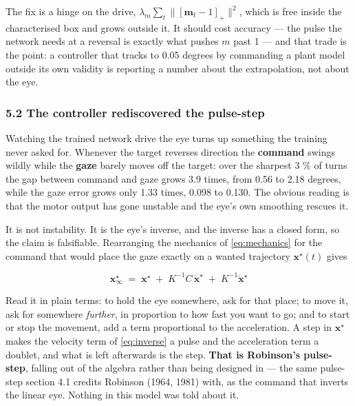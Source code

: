 \documentclass[10pt]{article}
\begin{document}
The fix is a hinge on the drive, $\lambda_m \sum_t \|[\mathbf{m}_t-1]_+\|^2$, which is free
inside the characterised box and grows outside it. It should cost accuracy --- the pulse the
network needs at a reversal is exactly what pushes $m$ past 1 --- and that trade is the
point: a controller that tracks to 0.05 degrees by commanding a plant model outside its own
validity is reporting a number about the extrapolation, not about the eye.

\subsubsection*{5.2 The controller rediscovered the pulse-step}

Watching the trained network drive the eye turns up something the training never asked for.
Whenever the target reverses direction the \textbf{command} swings wildly while the
\textbf{gaze} barely moves off the target: over the sharpest 3 \% of turns the gap between
command and gaze grows 3.9 times, from 0.56 to 2.18 degrees, while the gaze error grows only
1.33 times, 0.098 to 0.130. The obvious reading is that the motor output has gone unstable
and the eye's own smoothing rescues it.

It is not instability. It is the eye's inverse, and the inverse has a closed form, so the
claim is falsifiable. Rearranging the mechanics of \eqref{eq:mechanics} for the command that
would place the gaze exactly on a wanted trajectory $\mathbf{x}^{\star}(t)$ gives

\begin{equation}
\label{eq:inverse}
\mathbf{x}_{\infty}^{\star}
\;=\;\mathbf{x}^{\star}
\;+\;K^{-1}C\,\dot{\mathbf{x}}^{\star}
\;+\;K^{-1}\ddot{\mathbf{x}}^{\star}
\end{equation}

Read it in plain terms: to hold the eye somewhere, ask for that place; to move it, ask for
somewhere \emph{further}, in proportion to how fast you want to go; and to start or stop the
movement, add a term proportional to the acceleration. A step in $\mathbf{x}^{\star}$ makes
the velocity term of \eqref{eq:inverse} a pulse and the acceleration term a doublet, and
what is left afterwards is the step. \textbf{That is Robinson's pulse-step}, falling out of
the algebra rather than being designed in --- the same pulse-step section 4.1 credits
Robinson (1964, 1981) with, as the command that inverts the linear eye. Nothing in this
model was told about it.
\end{document}
